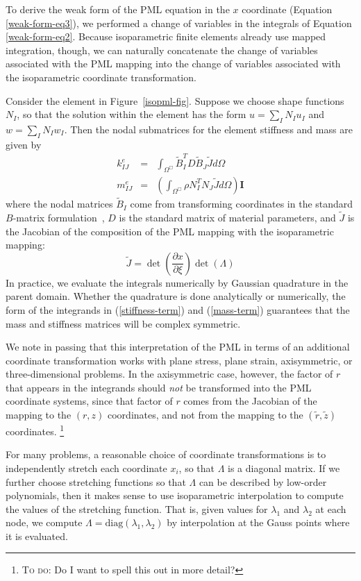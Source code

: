 \documentclass{article}
\newcommand{\diag}{\mathrm{diag}}
\newcommand{\bfI}{\mathbf{I}}
\newcommand{\note}[1]{\footnote{\textsc{To do}: #1}}
\begin{document}
To derive the weak form of the PML equation in the $x$ coordinate
(Equation \ref{weak-form-eq3}), we performed a change of variables
in the integrals of Equation \ref{weak-form-eq2}.  Because isoparametric
finite elements already use mapped integration, though, we can naturally
concatenate the change of variables associated with the PML mapping
into the change of variables associated with the isoparametric coordinate
transformation.

Consider the element in Figure~\ref{isopml-fig}.  Suppose we choose
shape functions $N_I$, so that the solution within the element has the
form $u = \sum_I N_I u_I$ and $w = \sum_I N_I w_I$.  Then the nodal submatrices
for the element stiffness and mass are given by
\begin{eqnarray}
  \label{stiffness-term}
  k^e_{IJ} & = &
    \int_{\Omega^{\Box}} \tilde{B}_I^T D \tilde{B}_J \tilde{J} d\Omega \\
  \label{mass-term}
  m^e_{IJ} & = &
    \left( \int_{\Omega^{\Box}} \rho N_I^T N_J \tilde{J} d\Omega \right) \bfI
\end{eqnarray}
where the nodal matrices $\tilde{B}_I$ come from transforming
coordinates in the standard $B$-matrix
formulation~\cite{Zienkiewicz:2000:FEMa}, $D$ is the standard matrix
of material parameters, and $\tilde{J}$ is the Jacobian of the
composition of the PML mapping with the isoparametric mapping:
\begin{equation}
  \tilde{J} = 
    \det\left( \frac{\partial x}{\partial \xi} \right)
    \det\left( \Lambda \right)
\end{equation}
In practice, we evaluate the integrals numerically by Gaussian
quadrature in the parent domain.  Whether the quadrature is done
analytically or numerically, the form of the integrands in
(\ref{stiffness-term}) and (\ref{mass-term}) guarantees that the
mass and stiffness matrices will be complex symmetric.

We note in passing that this interpretation of the PML in terms of an
additional coordinate transformation works with plane stress, plane
strain, axisymmetric, or three-dimensional problems.  In the
axisymmetric case, however, the factor of $r$ that appears in the
integrands should \emph{not} be transformed into the PML coordinate
systems, since that factor of $r$ comes from the Jacobian of the
mapping to the $(r,z)$ coordinates, and not from the mapping to the
$(\tilde{r}, \tilde{z})$ coordinates.
\note{Do I want to spell this out in more detail?}

For many problems, a reasonable choice of coordinate transformations
is to independently stretch each coordinate $x_i$, so that $\Lambda$
is a diagonal matrix.  If we further choose stretching functions so
that $\Lambda$ can be described by low-order polynomials, then it
makes sense to use isoparametric interpolation to compute the values
of the stretching function.  That is, given values for $\lambda_1$ and
$\lambda_2$ at each node, we compute $\Lambda = \diag(\lambda_1,
\lambda_2)$ by interpolation at the Gauss points where it is
evaluated.
\end{document}
